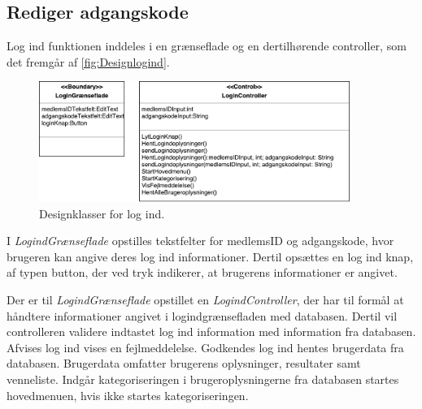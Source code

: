 \subsection{Rediger adgangskode}

Log ind funktionen inddeles i en grænseflade og en dertilhørende controller, som det fremgår af \autoref{fig:Designlogind}. 

\begin{figure} [H]
\centering
\includegraphics[width=0.9\textwidth]{figures/MVC/MVCLogInd}
\caption{Designklasser for log ind.}
\label{fig:Designlogind}
\end{figure}

I \textit{LogindGrænseflade} opstilles tekstfelter for medlemsID og adgangskode, hvor brugeren kan angive deres log ind informationer. Dertil opsættes en log ind knap, af typen button, der ved tryk indikerer, at brugerens informationer er angivet. 

Der er til \textit{LogindGrænseflade} opstillet en \textit{LogindController}, der har til formål at håndtere informationer angivet i logindgrænsefladen med databasen. Dertil vil controlleren validere indtastet log ind information med information fra databasen. Afvises log ind vises en fejlmeddelelse. Godkendes log ind hentes brugerdata fra databasen. Brugerdata omfatter brugerens oplysninger, resultater samt venneliste. Indgår kategoriseringen i brugeroplysningerne fra databasen startes hovedmenuen, hvis ikke startes kategoriseringen. 
